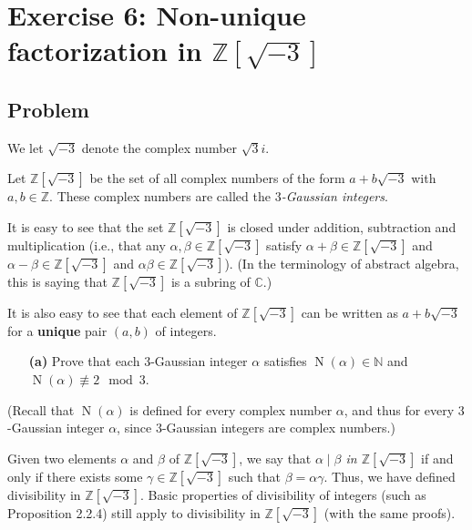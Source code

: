 \documentclass[paper=a4, fontsize=12pt]{scrartcl}%
\theoremstyle{plainsl}
\theoremstyle{definition}
\theoremstyle{remark}
\begin{document}
\section{Exercise 6: Non-unique factorization in $\mathbb{Z}\left[  \sqrt{-3}
\right]  $}

\subsection{Problem}

We let $\sqrt{-3}$ denote the complex number $\sqrt3 i$.

Let $\mathbb{Z}\left[  \sqrt{-3} \right]  $ be the set of all complex numbers
of the form $a + b \sqrt{-3}$ with $a, b \in\mathbb{Z}$. These complex numbers
are called the \textit{$3$-Gaussian integers}.

It is easy to see that the set $\mathbb{Z}\left[  \sqrt{-3} \right]  $ is
closed under addition, subtraction and multiplication (i.e., that any $\alpha,
\beta\in\mathbb{Z}\left[  \sqrt{-3} \right]  $ satisfy $\alpha+ \beta
\in\mathbb{Z}\left[  \sqrt{-3} \right]  $ and $\alpha- \beta\in\mathbb{Z}%
\left[  \sqrt{-3} \right]  $ and $\alpha\beta\in\mathbb{Z}\left[  \sqrt{-3}
\right]  $). (In the terminology of abstract algebra, this is saying that
$\mathbb{Z}\left[  \sqrt{-3} \right]  $ is a subring of $\mathbb{C}$.)

It is also easy to see that each element of $\mathbb{Z}\left[  \sqrt{-3}
\right]  $ can be written as $a + b \sqrt{-3}$ for a \textbf{unique} pair
$\left(  a, b \right)  $ of integers.

\begin{enumerate}
\item[\textbf{(a)}] Prove that each $3$-Gaussian integer $\alpha$ satisfies
$\operatorname{N}\left(  \alpha\right)  \in\mathbb{N}$ and $\operatorname{N}%
\left(  \alpha\right)  \not \equiv 2 \mod 3$.
\end{enumerate}

\noindent(Recall that $\operatorname{N}\left(  \alpha\right)  $ is defined for
every complex number $\alpha$, and thus for every $3$-Gaussian integer
$\alpha$, since $3$-Gaussian integers are complex numbers.)

Given two elements $\alpha$ and $\beta$ of $\mathbb{Z}\left[  \sqrt{-3}
\right]  $, we say that \textit{$\alpha\mid\beta$ in $\mathbb{Z}\left[
\sqrt{-3} \right]  $} if and only if there exists some $\gamma\in
\mathbb{Z}\left[  \sqrt{-3} \right]  $ such that $\beta= \alpha\gamma$. Thus,
we have defined divisibility in $\mathbb{Z}\left[  \sqrt{-3} \right]  $. Basic
properties of divisibility of integers (such as Proposition 2.2.4) still apply
to divisibility in $\mathbb{Z}\left[  \sqrt{-3} \right]  $ (with the same proofs).
\end{document}
